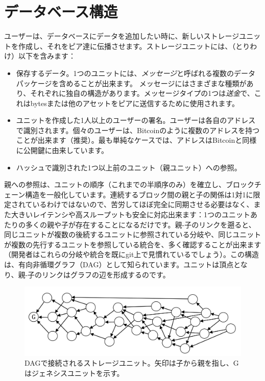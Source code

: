 \documentclass[a4paper, dvipdfmx]{jsarticle}
\begin{document}
\section{データベース構造}

ユーザーは、データベースにデータを追加したい時に、新しいストレージユニットを作成し、それをピア達に伝播させます。ストレージユニットには、（とりわけ）以下を含みます：
\begin{itemize}
    \item 保存するデータ。1つのユニットには、\emph{メッセージ}と呼ばれる複数のデータパッケージを含めることが出来ます。 メッセージにはさまざまな種類があり、それぞれに独自の構造があります。メッセージタイプの1つは\emph{送金}で、これはbytesまたは他のアセットをピアに送信するために使用されます。
    \item ユニットを作成した1人以上のユーザーの署名。ユーザーは各自のアドレスで識別されます。個々のユーザーは、Bitcoinのように複数のアドレスを持つことが出来ます（推奨）。最も単純なケースでは、アドレスはBitcoinと同様に公開鍵に由来しています。
    \item ハッシュで識別された1つ以上前のユニット（親ユニット）への参照。
\end{itemize}
親への参照は、ユニットの順序（これまでの半順序のみ）を確立し、ブロックチェーン構造を一般化しています。連続するブロック間の親と子の関係は1対1に限定されているわけではないので、苦労してほぼ完全に同期させる必要はなく、また大きいレイテンシや高スループットも安全に対応出来ます：1つのユニットあたりの多くの親や子が存在することになるだけです。親-子のリンクを遡ると、同じユニットが複数の後続するユニットに参照されている分岐や、同じユニットが複数の先行するユニットを参照している統合を、多く確認することが出来ます（開発者はこれらの分岐や統合を既にgit上で見慣れているでしょう）。この構造は、有向非循環グラフ（DAG）として知られています。ユニットは頂点となり、親-子のリンクはグラフの辺を形成するのです。

\begin{figure}[htbp]
  \includegraphics[width=\linewidth]{fig1.png}
  \caption{DAGで接続されるストレージユニット。矢印は子から親を指し、Gはジェネシスユニットを示す。}
\end{figure}
\end{document}
